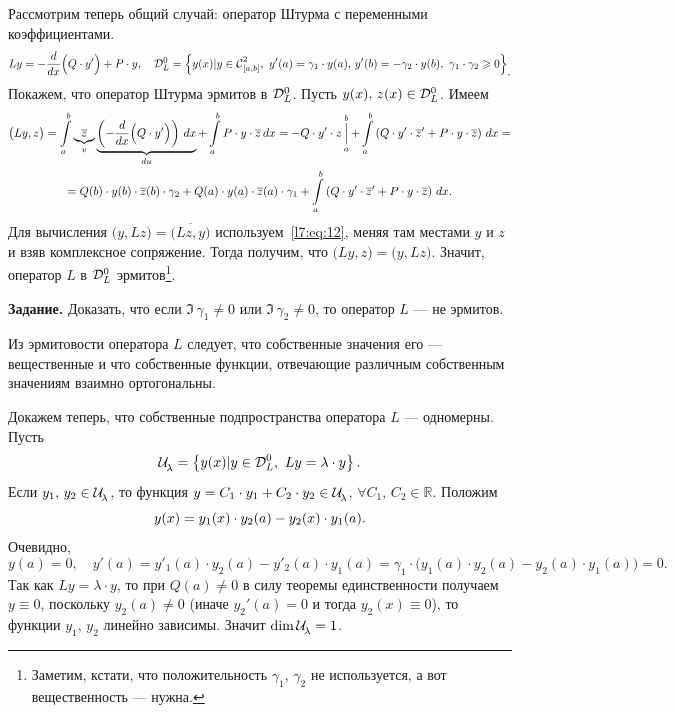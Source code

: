 Рассмотрим теперь общий случай: оператор Штурма с переменными коэффициентами.
\begin{equation*}
	Ly=-\der{}{x}\Big(Q\cdot y'\Big)+P\cdot y,\quad\mc{D}_{L}^{0}=\left\{y(x)|y\in\Cfn[{[a,b]}]{2},\ y'(a)=\gamma_1\cdot y(a),\,y'(b)=-\gamma_2\cdot y(b),\ \gamma_1\cdot\gamma_2\geqslant0\right\}_{\displaystyle.}
\end{equation*}
Покажем, что оператор Штурма эрмитов в $\mathcal{D}_{L}^{0}$. Пусть $y(x),\,z(x)\in\mathcal{D}_{L}^{0}$. Имеем 
\begin{multline}
	\label{l7:eq:12}
	\big(Ly,z\big)=\int\limits_a^b\underbrace{\overline{z}}_{v}\underbrace{\left(-\frac{d}{dx}\Big(Q\cdot y'\Big)\right)\,dx}_{du}+\int\limits_a^b P\cdot y\cdot\overline{z}\,dx=-Q\cdot y'\cdot z\mathop{\Big|}\limits_a^b+\int\limits_a^b\left(Q\cdot y'\cdot\overline{z}'+P\cdot y\cdot\overline{z}\right)\,dx=\\
	=Q(b)\cdot y(b)\cdot\overline{z}(b)\cdot\gamma_2+Q(a)\cdot y(a)\cdot\overline{z}(a)\cdot\gamma_1+\int\limits_a^b\left(Q\cdot y'\cdot\overline{z}'+P\cdot y\cdot\overline{z}\right)\,dx.
\end{multline}
Для вычисления $\big(y,Lz\big)=\overline{\big(Lz,y\big)}$ используем~\eqref{l7:eq:12}, меняя там местами $y$ и $z$ и взяв комплексное сопряжение. Тогда получим, что $\big(Ly,z\big)=\big(y,Lz\big)$. Значит, оператор $L$ в $\mathcal{D}_{L}^{0}$ эрмитов\footnote{Заметим, кстати, что положительность $\gamma_1$, $\gamma_2$ не используется, а вот вещественность --- нужна.}.
\vspace{0.2cm}

\noindent\textbf{Задание.} Доказать, что если $\Im\,\gamma_1\neq0$ или $\Im\,\gamma_2\neq0$, то оператор $L$ --- не эрмитов.
\vspace{0.2cm}

Из эрмитовости оператора $L$ следует, что собственные значения его --- вещественные и что собственные функции, отвечающие различным собственным значениям взаимно ортогональны.

Докажем теперь, что собственные подпространства оператора $L$ --- одномерны. Пусть
\begin{equation*}
	\hfill\Ul=\left\{y(x)|y\in\mc{D}_L^0,\ Ly=\lambda\cdot y\right\}.\hfill
\end{equation*}    
Если $y_1,\,y_2\in\mathcal{U}\!{\mathstrut}_{\lambda}$, то функция $y=C_1\cdot y_1+C_2\cdot y_2\in\mathcal{U}\!{\mathstrut}_{\lambda}$, $\forall C_1,\,C_2\in\mathbb{R}$. Положим
\begin{equation*}
	\hfill y(x)=y_1(x)\cdot y_2(a)-y_2(x)\cdot y_1(a).\hfill
\end{equation*}
Очевидно,
\begin{equation*}
	y(a)=0,\quad y'(a)=y'_1(a)\cdot y_2(a)-y'_2(a)\cdot y_1(a)=\gamma_1\cdot\big(y_1(a)\cdot y_2(a)-y_2(a)\cdot y_1(a)\big)=0.
\end{equation*} 
Так как $Ly=\lambda\cdot y$, то при $Q(a)\neq0$ в силу теоремы единственности получаем $y\equiv0$, поскольку $y_2(a)\neq0$ (иначе $y_2'(a)=0$ и тогда $y_2(x)\equiv0$), то функции $y_1,\,y_2$ линейно зависимы. Значит $\dim\mathcal{U}\!{\mathstrut}_{\lambda}=1$.

